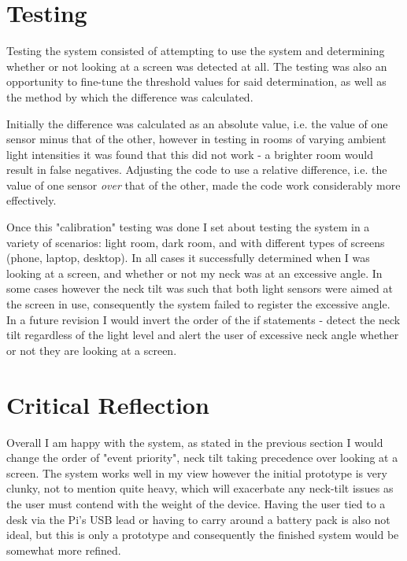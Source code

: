 \documentclass[12pt, a4paper]{report}
\begin{document}
\section{Testing}

Testing the system consisted of attempting to use the system and determining whether or not looking at a screen was detected at all.
The testing was also an opportunity to fine-tune the threshold values for said determination, as well as the method by which the difference was calculated.

\par

Initially the difference was calculated as an absolute value, i.e. the value of one sensor minus that of the other, however in testing in rooms of varying ambient light intensities it was found that this did not work - a brighter room would result in false negatives.
Adjusting the code to use a relative difference, i.e. the value of one sensor \textit{over} that of the other, made the code work considerably more effectively.

\par

Once this "calibration" testing was done I set about testing the system in a variety of scenarios: light room, dark room, and with different types of screens (phone, laptop, desktop).
In all cases it successfully determined when I was looking at a screen, and whether or not my neck was at an excessive angle.
In some cases however the neck tilt was such that both light sensors were aimed at the screen in use, consequently the system failed to register the excessive angle.
In a future revision I would invert the order of the if statements - detect the neck tilt regardless of the light level and alert the user of excessive neck angle whether or not they are looking at a screen.

\section{Critical Reflection}

Overall I am happy with the system, as stated in the previous section I would change the order of "event priority", neck tilt taking precedence over looking at a screen.
The system works well in my view however the initial prototype is very clunky, not to mention quite heavy, which will exacerbate any neck-tilt issues as the user must contend with the weight of the device.
Having the user tied to a desk via the Pi's USB lead or having to carry around a battery pack is also not ideal, but this is only a prototype and consequently the finished system would be somewhat more refined.
\end{document}
